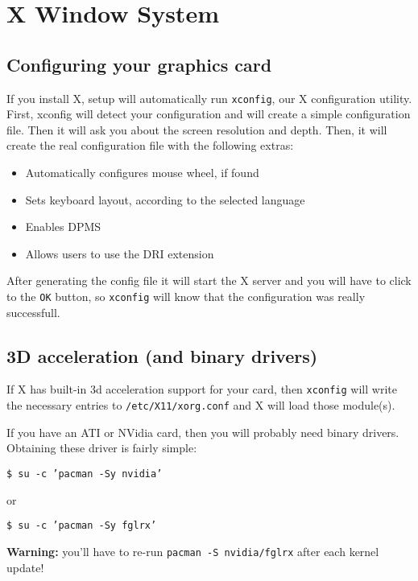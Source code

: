 \chapter{X Window System}

\section{Configuring your graphics card}
\label{section:xconfig}

If you install X, setup will automatically run {\tt xconfig}, our X configuration utility. First, xconfig will detect your configuration and will create a simple configuration file. Then it will ask you about the screen resolution and depth. Then, it will create the real configuration file with the following extras:

\begin{itemize}
\item Automatically configures mouse wheel, if found
\item Sets keyboard layout, according to the selected language
\item Enables DPMS
\item Allows users to use the DRI extension
\end{itemize}

After generating the config file it will start the X server and you will have to click to the {\tt OK} button, so {\tt xconfig} will know that the configuration was really successfull.

\section{3D acceleration (and binary drivers)}

If X has built-in 3d acceleration support for your card, then {\tt xconfig} will write the necessary entries to {\tt /etc/X11/xorg.conf} and X will load those module(s). 

If you have an ATI or NVidia card, then you will probably
need binary drivers. Obtaining these driver is fairly
simple:

{\tt \$ su -c 'pacman -Sy nvidia'}

or

{\tt \$ su -c 'pacman -Sy fglrx'}

\textbf{Warning:} you'll have to re-run {\tt pacman -S nvidia/fglrx} after each kernel update!